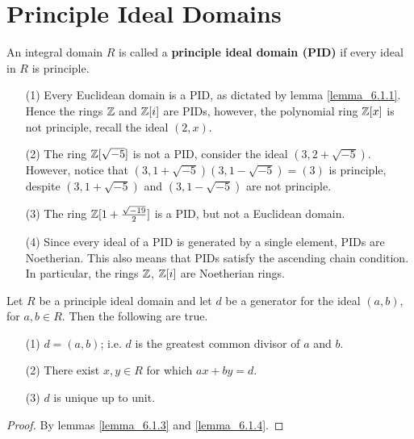 \section{Principle Ideal Domains}
\label{section_6.2}

\begin{definition}
  An integral domain $R$ is called a \textbf{principle ideal domain (PID)} if
  every ideal in $R$ is principle.
\end{definition}

\begin{example}\label{example_6.4}
  \begin{enumerate}
    \item[(1)] Every Euclidean domain is a PID, as dictated by lemma
      \ref{lemma_6.1.1}. Hence the rings $\mathbb{Z}$ and  $\mathbb{Z}[i]$ are PIDs, however,
      the polynomial ring $\mathbb{Z}[x]$ is not principle, recall the ideal
      $(2,x)$.

    \item[(2)] The ring $\mathbb{Z}[\sqrt{-5}]$ is not a PID, consider the ideal
      $(3,2+\sqrt{-5})$. However, notice that
      $(3,1+\sqrt{-5})(3,1-\sqrt{-5})=(3)$ is principle, despite
      $(3,1+\sqrt{-5})$ and $(3,1-\sqrt{-5})$ are not principle.

    \item[(3)] The ring $\mathbb{Z}[1+\frac{\sqrt{-19}}{2}]$ is a PID, but not a
      Euclidean domain.

    \item[(4)] Since every ideal of a PID is generated by a single
      element, PIDs are Noetherian. This also means that PIDs satisfy
      the ascending chain condition. In particular, the rings $\mathbb{Z}$,
      $\mathbb{Z}[i]$ are Noetherian rings.
  \end{enumerate}
\end{example}

\begin{lemma}\label{lemma_6.6.1}
  Let $R$ be a principle ideal domain and let $d$ be a generator for the ideal
  $(a,b)$, for $a,b \in R$. Then the following are true.
  \begin{enumerate}
    \item[(1)] $d=(a,b)$; i.e. $d$ is the greatest common divisor of $a$ and
      $b$.

    \item[(2)] There exist $x,y \in R$ for which  $ax+by=d$.

    \item[(3)] $d$ is unique up to unit.
  \end{enumerate}
\end{lemma}
\begin{proof}
  By lemmas \ref{lemma_6.1.3} and \ref{lemma_6.1.4}.
\end{proof}

